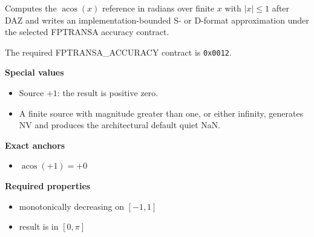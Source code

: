Computes the $\operatorname{acos}(x)$ reference in radians over finite $x$ with $|x| \le 1$ after DAZ and writes an implementation-bounded S- or D-format approximation under the selected FPTRANSA accuracy contract.

The required FPTRANSA\_ACCURACY contract is \texttt{0x0012}.

\textbf{Special values}\par
\begin{itemize}
\item Source $+1$: the result is positive zero.
\item A finite source with magnitude greater than one, or either infinity, generates NV and produces the architectural default quiet NaN.
\end{itemize}

\textbf{Exact anchors}\par
\begin{itemize}
\item $\operatorname{acos}(+1) = +0$
\end{itemize}

\textbf{Required properties}\par
\begin{itemize}
\item monotonically decreasing on $[-1, 1]$
\item result is in $[0, \pi]$
\end{itemize}
